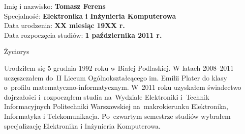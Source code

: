 \newpage
{
\vfill

\vspace{3mm} 
\hfill Imię i nazwisko: \textbf{Tomasz Ferens}  \\
\vspace{3mm} 
\hfill Specjalność: \textbf{Elektronika i Inżynieria Komputerowa}  \\ 
\vspace{3mm}   
\hfill Data urodzenia: \textbf{XX miesiąc 19XX r. }  \\ 
\vspace{3mm} 
\hfill Data rozpoczęcia studiów: \textbf{1 października 2011 r. }  \\ 
\vfill
\begin{center}
{ {\LARGE Życiorys} } \\ \bigskip
\end{center}

\vspace{2cm}
\hspace{1cm} Urodziłem się 5 grudnia 1992 roku w Białej Podlaskiej. W latach 2008--2011
uczęszczałem do~II Liceum Ogólnokształcącego im. Emilii Plater do klasy o~profilu matematyczno-informatycznym. W~2011 roku uzyskałem świadectwo dojrzałości i~rozpocząłem studia na~Wydziale Elektroniki i~Technik Informacyjnych Politechniki Warszawskiej na~makrokierunku Elektronika, Informatyka i Telekomunikacja. Po~czwartym semestrze studiów wybrałem
specjalizację Elektronika i Inżynieria Komputerowa. \\ 
\vfill
\vspace{4cm}
}